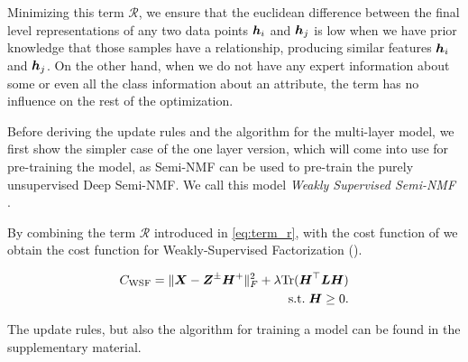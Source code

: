 \documentclass[10pt,journal,compsoc]{IEEEtran}
\begin{document}
Minimizing this term $\mathcal R$, we ensure that the euclidean difference between the final level representations of any two data points $\boldsymbol{h}_i$ and $\boldsymbol{h}_j$ is low when we have prior knowledge that those samples have a relationship, producing similar features $\boldsymbol{h}_i$  and $\boldsymbol{h}_j$. On the other hand, when we do not have any expert information about some or even all the class information about an attribute, the term has no influence on the rest of the optimization.

\label{sec:wsnmf}
Before deriving the update rules and the algorithm for the multi-layer \dwsf{} model, we first show the simpler case of the one layer version, which will come into use for pre-training the model, as Semi-NMF can be used to pre-train the purely unsupervised Deep Semi-NMF. We call this model {\it Weakly Supervised Semi-NMF} \wsf{}. 

By combining the term $\mathcal R$ introduced in \autoref{eq:term_r}, with the cost function of \seminmf we obtain the cost function for Weakly-Supervised Factorization (\wsf).

\begin{align}\notag
C_{\text{WSF}}=\|{\boldsymbol{X}} - {\boldsymbol{Z}^{\pm}}{\boldsymbol{H}^{+}}\|^2_F + \lambda \text{Tr}(\boldsymbol{H}^\top \boldsymbol{L} \boldsymbol{H})\\ \label{eq:obj_wsnmf} \text{s.t.}\; \boldsymbol{H} \geq 0.
\end{align}

 
The update rules, but also the algorithm for training a \wsf model can be found in the supplementary material.

 

\end{document}
